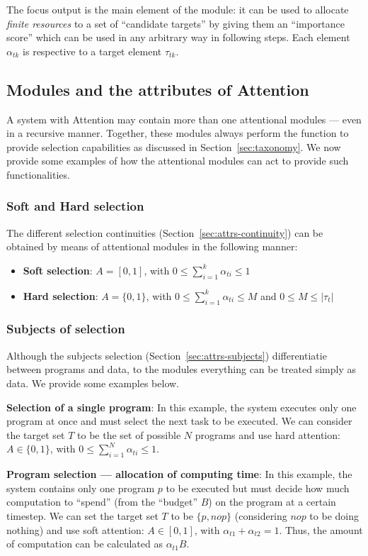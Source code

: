 \documentclass[11pt]{article}
\begin{document}
The focus output is the main element of the module: it can be used to allocate \emph{finite resources} to a set of ``candidate targets'' by giving them an ``importance score'' which can be used in any arbitrary way in following steps.
Each element $\alpha_{tk}$ is respective to a target element $\tau_{tk}$.

\subsection{Modules and the attributes of Attention}
A system with Attention may contain more than one attentional modules --- even in a recursive manner.
Together, these modules always perform the function to provide selection capabilities
as discussed in Section~\ref{sec:taxonomy}.
We now provide some examples of how the attentional modules can act to provide such functionalities.

\subsubsection{Soft and Hard selection}
The different selection continuities (Section~\ref{sec:attrs-continuity})
can be obtained by means of attentional modules in the following manner:
\begin{itemize}
    \item \textbf{Soft selection}:
        $A = [0, 1]$, with $0 \le \sum_{i=1}^{k} \alpha_{ti} \le 1$
    \item \textbf{Hard selection}:
        $A = \{0, 1\}$, with $0 \le \sum_{i=1}^{k} \alpha_{ti} \le M$ and $0 \le M \le |\tau_t|$
\end{itemize}

\subsubsection{Subjects of selection}
Although the subjects selection (Section~\ref{sec:attrs-subjects})
differentiatie between programs and data, to the modules everything
can be treated simply as data. We provide some examples below.

\textbf{Selection of a single program}:
In this example, the system executes only one program at once and must
select the next task to be executed.
We can consider the target set $T$ to be the set of possible $N$ programs
and use hard attention: $A \in \{0, 1\}$, with $0 \le \sum_{i=1}^{N} \alpha_{ti} \le 1$.

\textbf{Program selection --- allocation of computing time}:
In this example, the system contains only one program $p$ to be executed but
must decide how much computation to ``spend'' (from the ``budget'' $B$) on the program at a certain timestep.
We can set the target set $T$ to be $\{p, nop\}$ (considering $nop$ to be doing nothing) and
use soft attention: $A \in [0, 1]$, with $\alpha_{t1} + \alpha_{t2} = 1$.
Thus, the amount of computation can be calculated as $\alpha_{t1}B$.
\end{document}
